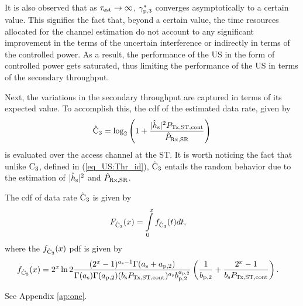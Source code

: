 \begin{remark}
{It is also observed that as $\tau_{\text{est}} \rightarrow \infty$, ${\gamma}_{\text{p,3}}^*$ converges asymptotically to a certain value. This signifies the fact that, beyond a certain value, the time resources allocated for the channel estimation do not account to any significant improvement in the terms of the uncertain interference or indirectly in terms of the controlled power. As a result, the performance of the US in the form of controlled power gets saturated, thus limiting the performance of the US in terms of the secondary throughput.}  %
\end{remark}
Next, the variations in the secondary throughput are captured in terms of its expected value. To accomplish this, the cdf of the estimated data rate, given by%
\begin{align}
\hat{\text{{C}}}_{\text{3}}  = \log_2 \left(1 + \frac{|\hat{h}_{\text{s}}|^2 P_{\text{Tx,ST,cont}}}{\hat{P}_{\text{Rx,SR}}} \right) \label{eq_US:eca}
\end{align}
is evaluated over the access channel at the ST. It is worth noticing the fact that unlike $\text{C}_{\text{3}}$, defined in (\ref{eq_US:Thr_id}), $\hat{\text{{C}}}_{\text{3}}$ entails the random behavior due to the estimation of $|\hat{h}_{\text{s}}|^2$ and $\hat{P}_{\text{Rx,SR}}$.
\begin{lemma} \label{lm_US:lm5}
\normalfont 
The cdf of data rate $\hat{\text{{C}}}_{\text{3}}$ is given by
\begin{align}
F_{\hat{\text{{C}}}_{\text{3}}}(x) &= \int\limits_{0}^{x} f_{\hat{\text{{C}}}_{\text{3}}}(t) dt, \label{eq_US:dis_C} 
\end{align}
where the $f_{\hat{\text{{C}}}_{\text{3}}}(x)$ pdf is given by 
\begin{align}
f_{\hat{\text{{C}}}_{\text{3}}}(x) &= 2^x \ln 2 \frac{(2^x - 1)^{a_{\text{s}} - 1} \Gamma(a_{\text{s}} + a_{\text{p,2}})}{\Gamma(a_{\text{s}}) \Gamma(a_{\text{p,2}}) (b_{\text{s}} P_{\text{Tx,ST,cont}}) ^{a_{\text{s}}} b_{\text{p,2}}^{a_{\text{p,2}}}} \left(\frac{1}{b_{\text{p,2}}} + \frac{2^x - 1}{b_{\text{s}} P_{\text{Tx,ST,cont}}}\right). \label{eq_US:den_C}
\end{align}
\end{lemma}
\begin{IEEEproof}[Solution]
See Appendix \ref{ap:one}.
\end{IEEEproof}

